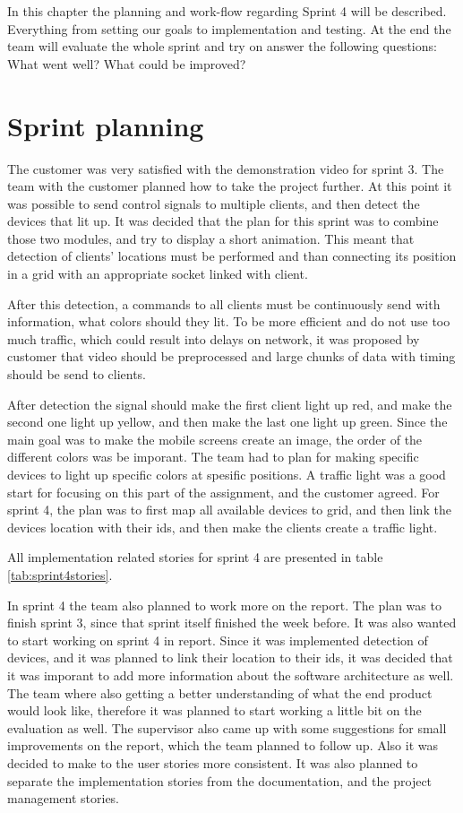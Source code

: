 In this chapter the planning and work-flow regarding Sprint 4 will be described. 
Everything from setting our goals to implementation and testing. At the end the team will evaluate the whole sprint and try on answer the following questions: What went well? What could be improved? 
\section{Sprint planning}

The customer was very satisfied with the demonstration video for sprint 3. 
The team with the customer planned how to take the project further. 
At this point it was possible to send control signals to multiple clients, and then detect the devices that lit up. 
It was decided that the plan for this sprint was to combine those two modules, and try to display a short animation.
This meant that detection of clients' locations must be performed and than connecting its position in a grid with an appropriate socket linked with client.

After this detection, a commands to all clients must be continuously send with information, what colors should they lit.
To be more efficient and do not use too much traffic, which could result into delays on network, it was proposed by customer that video should be preprocessed and large chunks of data with timing should be send to clients.

After detection the signal should make the first client light up red, and make the second one light up yellow, and then make the last one light up green. 
Since the main goal was to make the mobile screens create an image, the order of the different colors was be imporant. The team had to plan for making specific devices to light up specific colors at spesific positions. 
A traffic light was a good start for focusing on this part of the assignment, and the customer agreed. 
For sprint 4, the plan was to first map all available devices to grid, and then link the devices location with their ids, and then make the clients create a traffic light.


All implementation related stories for sprint 4 are presented in table \ref{tab:sprint4stories}.



In sprint 4 the team also planned to work more on the report. 
The plan was to finish sprint 3, since that sprint itself finished the week before. 
It was also wanted to start working on sprint 4 in report. 
Since it was implemented detection of devices, and it was planned to link their location to their ids, it was decided that it was imporant to add more information about the software architecture as well. 
The team where also getting a better understanding of what the end product would look like, therefore it was planned to start working a little bit on the evaluation as well. 
The supervisor also came up with some suggestions for small improvements on the report, which the team planned to follow up.
Also it was decided to make to the user stories more consistent. 
It was also planned to separate the implementation stories from the documentation, and the project management stories.

